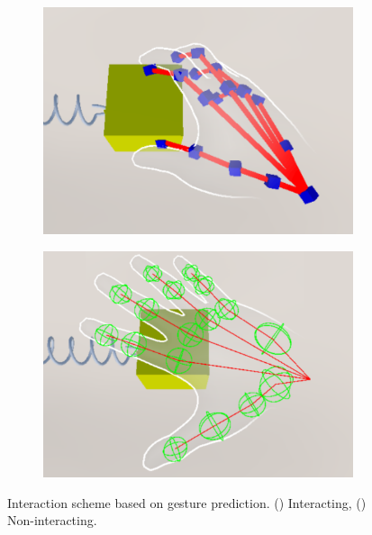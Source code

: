 \documentclass[runningheads]{llncs}
\begin{document}
\begin{figure}
  \begin{subfigure}{0.48\linewidth} %
    \centering
    \includegraphics[width=\linewidth]{image/interacting-scheme.pdf}
    \caption{} %
    \label{fig:interacting-scheme}
  \end{subfigure}
  \hfill %
  \begin{subfigure}{0.48\linewidth} %
    \centering
    \includegraphics[width=\linewidth]{image/non-interacting-scheme.pdf}
    \caption{} %
    \label{fig:non-interacting-scheme}
  \end{subfigure}
  \caption{Interaction scheme based on gesture prediction. () Interacting, () Non-interacting.}
  \label{fig:interaction-scheme}
\end{figure}
\end{document}
